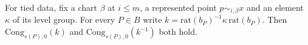 
\begin{formalstatement}\label{pn:P134}
For tied data, fix a chart $\beta$ at $i\le m$, a represented point
$p\sim_{i,\beta}x$ and an element $\kappa$ of its level group. For every
$P\in B$ write $k=\mathrm{rat}(b_P)^{-1}\kappa\,\mathrm{rat}(b_P)$.
Then $\mathrm{Cong}_{s(P),0}(k)$ and $\mathrm{Cong}_{s(P),0}(k^{-1})$
both hold.
\end{formalstatement}
